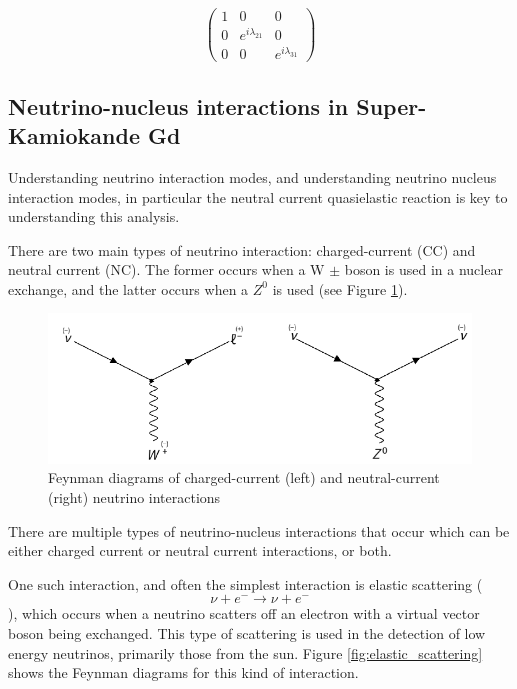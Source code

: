 $$
\left(\begin{array}{ccc}
1 & 0 & 0 \\
0 & e^{i \lambda_{21}} & 0 \\
0 & 0 & e^{i \lambda_{31}}
\end{array}\right)
\label{eq:maj_nu}
$$


\subsection{Neutrino-nucleus interactions in Super-Kamiokande Gd}
Understanding neutrino interaction modes, and understanding neutrino nucleus interaction modes, in particular the neutral current quasielastic reaction is key to understanding this analysis. 

There are two main types of neutrino interaction: charged-current (CC) and neutral current (NC). The former occurs when a W $\pm$ boson is used in a nuclear exchange, and the latter occurs when a $Z^{0}$ is used (see Figure \ref{fig:CC_NC}).

\begin{figure}
    \includegraphics[width=\textwidth]{Figures/CC_NC.png}
    \caption{Feynman diagrams of charged-current (left) and neutral-current (right) neutrino interactions}
    \label{fig:CC_NC}
\end{figure}

There are multiple types of neutrino-nucleus interactions that occur which can be either charged current or neutral current interactions, or both. 

One such interaction, and often the simplest interaction is elastic scattering ($$
\nu+e^{-} \rightarrow \nu+e^{-}
$$), which occurs when a neutrino scatters off an electron with a virtual vector boson being exchanged. This type of scattering is used in the detection of low energy neutrinos, primarily those from the sun. Figure \ref{fig:elastic_scattering} shows the Feynman diagrams for this kind of interaction.

